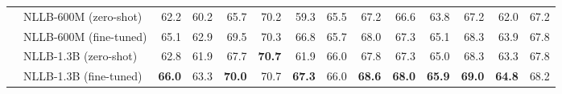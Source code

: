 \begin{table}[t!]
\begin{tabular}{llrrrrrrrrrrrr}
 & NLLB-600M (zero-shot) & 62.2 & 60.2 & 65.7 & 70.2 & 59.3 & 65.5 & 67.2 & 66.6 & 63.8 & 67.2 & 62.0 & 67.2 \\
 & NLLB-600M (fine-tuned) & 65.1 & 62.9 & 69.5 & 70.3 & 66.8 & 65.7 & 68.0 & 67.3 & 65.1 & 68.3 & 63.9 & 67.8 \\
 & NLLB-1.3B (zero-shot) & 62.8 & 61.9 & 67.7 & \textbf{70.7} & 61.9 & 66.0 & 67.8 & 67.3 & 65.0 & 68.3 & 63.3 & 67.8 \\
 & NLLB-1.3B (fine-tuned) & \textbf{66.0} & 63.3 & \textbf{70.0} & 70.7 & \textbf{67.3} & 66.0 & \textbf{68.6} & \textbf{68.0} & \textbf{65.9} & \textbf{69.0} & \textbf{64.8} & 68.2 \\
\bottomrule
\end{tabular}
\end{table}